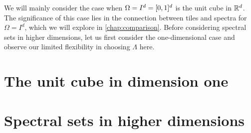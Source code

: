 \documentclass[../thesis.tex]{subfiles}
\begin{document}
We will mainly consider the case when $\Omega=I^d=[0,1]^d$ is the unit cube in $\mathbb{R}^d$. The significance of this case lies in the connection between tiles and spectra for $\Omega=I^d$, which we will explore in \cref{chap:comparison}. Before considering spectral sets in higher dimensions, let us first consider the one-dimensional case and observe our limited flexibility in choosing $\Lambda$ here.

\section{The unit cube in dimension one}\label{sec:complx_trig_1d}





\section{Spectral sets in higher dimensions}\label{sec:spec_higher_dim}
    
\end{document}
